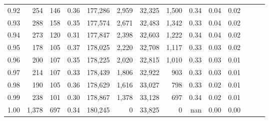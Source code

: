 \begin{tabular}{rrrrrrrrrrrrrr}
0.92 &    254 &  146 &  0.36 &  177,286 &    2,959 &  32,325 &   1,500 &  0.34 &  0.04 &      0.02 \\
0.93 &    288 &  158 &  0.35 &  177,574 &    2,671 &  32,483 &   1,342 &  0.33 &  0.04 &      0.02 \\
0.94 &    273 &  120 &  0.31 &  177,847 &    2,398 &  32,603 &   1,222 &  0.34 &  0.04 &      0.02 \\
0.95 &    178 &  105 &  0.37 &  178,025 &    2,220 &  32,708 &   1,117 &  0.33 &  0.03 &      0.02 \\
0.96 &    200 &  107 &  0.35 &  178,225 &    2,020 &  32,815 &   1,010 &  0.33 &  0.03 &      0.01 \\
0.97 &    214 &  107 &  0.33 &  178,439 &    1,806 &  32,922 &     903 &  0.33 &  0.03 &      0.01 \\
0.98 &    190 &  105 &  0.36 &  178,629 &    1,616 &  33,027 &     798 &  0.33 &  0.02 &      0.01 \\
0.99 &    238 &  101 &  0.30 &  178,867 &    1,378 &  33,128 &     697 &  0.34 &  0.02 &      0.01 \\
1.00 &  1,378 &  697 &  0.34 &  180,245 &        0 &  33,825 &       0 &   nan &  0.00 &      0.00 \\
\bottomrule
\end{tabular}
